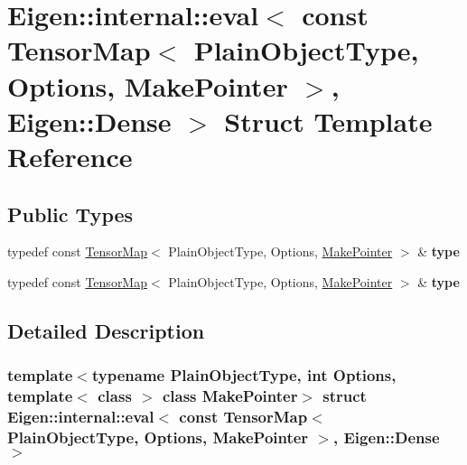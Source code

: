 \hypertarget{struct_eigen_1_1internal_1_1eval_3_01const_01_tensor_map_3_01_plain_object_type_00_01_options_00f2ed4b30308fb6eaa0741d03c8445225}{}\section{Eigen\+:\+:internal\+:\+:eval$<$ const Tensor\+Map$<$ Plain\+Object\+Type, Options, Make\+Pointer $>$, Eigen\+:\+:Dense $>$ Struct Template Reference}
\label{struct_eigen_1_1internal_1_1eval_3_01const_01_tensor_map_3_01_plain_object_type_00_01_options_00f2ed4b30308fb6eaa0741d03c8445225}
\subsection*{Public Types}
\begin{DoxyCompactItemize}
\item 
\mbox{\label{struct_eigen_1_1internal_1_1eval_3_01const_01_tensor_map_3_01_plain_object_type_00_01_options_00f2ed4b30308fb6eaa0741d03c8445225_abeac2b4fdcbefb72b9b0becd7f089d1d}} 
typedef const \hyperlink{class_eigen_1_1_tensor_map}{Tensor\+Map}$<$ Plain\+Object\+Type, Options, \hyperlink{struct_eigen_1_1_make_pointer}{Make\+Pointer} $>$ \& {\bfseries type}
\item 
\mbox{\label{struct_eigen_1_1internal_1_1eval_3_01const_01_tensor_map_3_01_plain_object_type_00_01_options_00f2ed4b30308fb6eaa0741d03c8445225_abeac2b4fdcbefb72b9b0becd7f089d1d}} 
typedef const \hyperlink{class_eigen_1_1_tensor_map}{Tensor\+Map}$<$ Plain\+Object\+Type, Options, \hyperlink{struct_eigen_1_1_make_pointer}{Make\+Pointer} $>$ \& {\bfseries type}
\end{DoxyCompactItemize}


\subsection{Detailed Description}
\subsubsection*{template$<$typename Plain\+Object\+Type, int Options, template$<$ class $>$ class Make\+Pointer$>$\newline
struct Eigen\+::internal\+::eval$<$ const Tensor\+Map$<$ Plain\+Object\+Type, Options, Make\+Pointer $>$, Eigen\+::\+Dense $>$}



